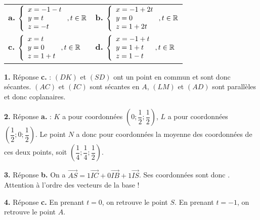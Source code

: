 \documentclass[11pt,fleqn, openany]{book} %
\begin{document}
\begin{exercise}[topic=geo05, subtitle={(Métropole 2021)}]
\begin{enumerate}
\vskip10pt
\begin{tabularx}{\linewidth}{XX}

\textbf{a.} $\left\{\renewcommand{\arraystretch}{1}\begin{array}{l} x = -1 -t \\ y = t \\ z = -t 
\end{array}\right. , t\in \mathbb{R}$ & \textbf{b.} $\left\{\renewcommand{\arraystretch}{1}\begin{array}{l} x = -1 +2t \\ y = 0 \\ z = 1+2t \end{array}\right. , t\in \mathbb{R}$  \\ \textbf{c.} $\left\{\renewcommand{\arraystretch}{1}\begin{array}{l} x = t \\ y = 0 \\ z = 1+t \end{array}\right. , t\in \mathbb{R}$ & \textbf{d.} $\left\{\renewcommand{\arraystretch}{1}\begin{array}{l} x = -1 +t \\ y = 1+t \\ z = 1-t \end{array}\right. , t\in \mathbb{R}$ \end{tabularx}


\end{enumerate}

\end{exercise}

\begin{solution}
\textbf{1.} Réponse \textbf{c.} : $(DK)$ et $(SD)$ ont un point en commun et sont donc sécantes. $(AC)$ et $(IC)$ sont sécantes en $A$, $(LM)$ et $(AD)$ sont parallèles et donc coplanaires.

\textbf{2.} Réponse \textbf{a.} : $K$ a pour coordonnées $\left(0;\dfrac{1}{2};\dfrac{1}{2}\right)$, $L$ a pour coordonnées $\left(\dfrac{1}{2};0;\dfrac{1}{2}\right)$. Le point $N$ a donc pour coordonnées la moyenne des coordonnées de ces deux points, soit $\left(\dfrac{1}{4};\dfrac{1}{4};\dfrac{1}{2}\right)$.

\textbf{3.} Réponse \textbf{b.} On a $\overrightarrow{AS}= 1\overrightarrow{IC}+0\overrightarrow{IB}+1\overrightarrow{IS}$. Ses coordonnées sont donc \renewcommand{\arraystretch}{1}. Attention à l'ordre des vecteurs de la base !

\textbf{4.} Réponse \textbf{c.} En prenant $t=0$, on retrouve le point $S$. En prenant $t=-1$, on retrouve le point $A$.\end{solution}
\end{document}
